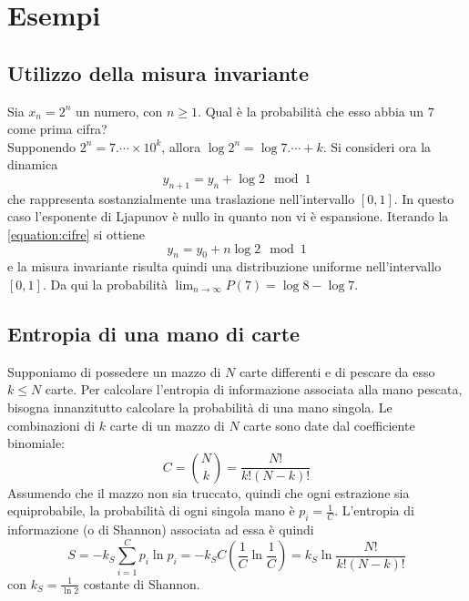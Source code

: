 \documentclass[12pt, a4paper]{book}
\theoremstyle{theorem}
\begin{document}
		\section{Esempi}
			\subsection{Utilizzo della misura invariante}
				Sia $x_{n}=2^{n}$ un numero, con $n \geq 1$.
				Qual è la probabilità che esso abbia un $7$ come prima cifra?
				\\Supponendo $2^{n}=7.\cdots\times 10^{k}$, allora $\log{2^{n}}=\log{7.\cdots}+k$.
				Si consideri ora la dinamica
				\begin{equation}
					y_{n+1}=y_{n}+\log2\mod1
					\label{equation:cifre}
				\end{equation}
				che rappresenta sostanzialmente una traslazione nell'intervallo $[0,1]$.
				In questo caso l'esponente di Ljapunov è nullo in quanto non vi è espansione.
				Iterando la \ref{equation:cifre} si ottiene
				\begin{equation*}
					y_{n}=y_{0}+n\log2\mod1
				\end{equation*}
				e la misura invariante risulta quindi una distribuzione uniforme nell'intervallo $[0,1]$.
				Da qui la probabilità $\lim_{n\to\infty}P(7)=\log8-\log7$.
			\subsection{Entropia di una mano di carte}
				Supponiamo di possedere un mazzo di $N$ carte differenti e di pescare da esso $k\leq N$ carte.
				Per calcolare l'entropia di informazione associata alla mano pescata, bisogna innanzitutto calcolare la probabilità di una mano singola.
				Le combinazioni di $k$ carte di un mazzo di $N$ carte sono date dal coefficiente binomiale:
				\begin{equation}
					C=\binom{N}{k}=\frac{N!}{k!(N-k)!}
				\end{equation}
				Assumendo che il mazzo non sia truccato, quindi che ogni estrazione sia equiprobabile, la probabilità di ogni singola mano è $p_{i}=\frac{1}{C}$.
				L'entropia di informazione (o di Shannon) associata ad essa è quindi 
				\begin{equation*}
					S=-k_{S}\sum_{i=1}^{C}p_{i}\ln{p_{i}}=-k_{S}C\left(\frac{1}{C}\ln{\frac{1}{C}}\right)=k_{S}\ln{\frac{N!}{k!(N-k)!}}
				\end{equation*}
				con $k_{S}=\frac{1}{\ln2}$ costante di Shannon.
\end{document}

